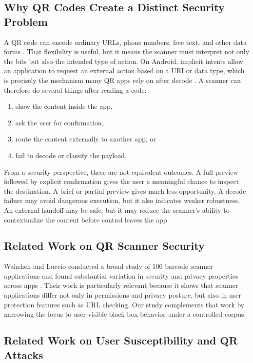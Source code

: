 \documentclass[11pt]{article}
\begin{document}
\subsection{Why QR Codes Create a Distinct Security Problem}

A QR code can encode ordinary URLs, phone numbers, free text, and other data forms \cite{denso-standard,denso-overview}. That flexibility is useful, but it means the scanner must interpret not only the bits but also the intended type of action. On Android, implicit intents allow an application to request an external action based on a URI or data type, which is precisely the mechanism many QR apps rely on after decode \cite{android-intents,android-common-app-intents}. A scanner can therefore do several things after reading a code:
\begin{enumerate}[leftmargin=1.5em]
    \item show the content inside the app,
    \item ask the user for confirmation,
    \item route the content externally to another app, or
    \item fail to decode or classify the payload.
\end{enumerate}

From a security perspective, these are not equivalent outcomes. A full preview followed by explicit confirmation gives the user a meaningful chance to inspect the destination. A brief or partial preview gives much less opportunity. A decode failure may avoid dangerous execution, but it also indicates weaker robustness. An external handoff may be safe, but it may reduce the scanner's ability to contextualize the content before control leaves the app.

\subsection{Related Work on QR Scanner Security}

Wahsheh and Luccio conducted a broad study of 100 barcode scanner applications and found substantial variation in security and privacy properties across apps \cite{wahsheh2020}. Their work is particularly relevant because it shows that scanner applications differ not only in permissions and privacy posture, but also in user protection features such as URL checking. Our study complements that work by narrowing the focus to user-visible black-box behavior under a controlled corpus.

\subsection{Related Work on User Susceptibility and QR Attacks}
\end{document}
